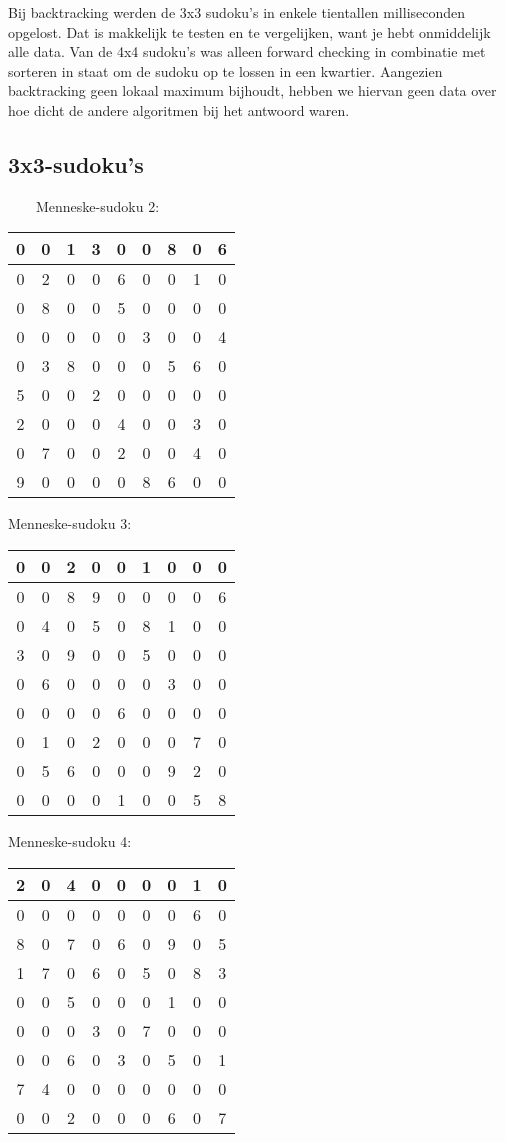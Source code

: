 \documentclass[]{report}
\begin{document}
Bij backtracking werden de 3x3 sudoku's in enkele tientallen milliseconden opgelost. Dat is makkelijk te testen en te vergelijken, want je hebt onmiddelijk alle data. Van de 4x4 sudoku's was alleen forward checking in combinatie met sorteren in staat om de sudoku op te lossen in een kwartier. Aangezien backtracking geen lokaal maximum bijhoudt, hebben we hiervan geen data over hoe dicht de andere algoritmen bij het antwoord waren.

 

\subsection{3x3-sudoku's}
\ \ \ \ Menneske-sudoku 2:
\begin{tabular}{|c|c|c||c|c|c||c|c|c|}
\hline
0 &0& 1& 3& 0& 0& 8& 0& 6 \\ \hline
0 &2 &0 &0 &6 &0 &0& 1& 0\\ \hline
0& 8& 0& 0& 5& 0& 0& 0& 0\\ \hline\hline
0& 0& 0& 0& 0& 3& 0& 0& 4\\ \hline
0 &3 &8 &0 &0 &0 &5 &6 &0\\ \hline
5& 0& 0& 2& 0& 0& 0& 0& 0\\ \hline\hline
2& 0& 0& 0& 4& 0& 0& 3& 0\\ \hline
0 &7 &0 &0 &2 &0 &0 &4 &0\\ \hline
9 &0 &0 &0 &0 &8 &6 &0& 0\\ \hline
\end{tabular}

Menneske-sudoku 3:
\begin{tabular}{|c|c|c||c|c|c||c|c|c|}
\hline
0&0&2&0&0&1&0&0&0 \\ \hline
0&0&8&9&0&0&0&0&6\\ \hline
0&4&0&5&0&8&1&0&0\\ \hline \hline
3&0&9&0&0&5&0&0&0\\ \hline
0&6&0&0&0&0&3&0&0\\ \hline
0&0&0&0&6&0&0&0&0\\ \hline \hline
0&1&0&2&0&0&0&7&0\\ \hline
0&5&6&0&0&0&9&2&0\\ \hline
0&0&0&0&1&0&0&5&8\\ \hline
\end{tabular}

Menneske-sudoku 4:
\begin{tabular}{|c|c|c||c|c|c||c|c|c|}
\hline
2&0&4&0&0&0&0&1&0 \\ \hline
0&0&0&0&0&0&0&6&0\\ \hline
8&0&7&0&6&0&9&0&5\\ \hline \hline
1&7&0&6&0&5&0&8&3\\ \hline
0&0&5&0&0&0&1&0&0\\ \hline
0&0&0&3&0&7&0&0&0\\ \hline \hline
0&0&6&0&3&0&5&0&1\\ \hline
7&4&0&0&0&0&0&0&0\\ \hline
0&0&2&0&0&0&6&0&7\\ \hline
\end{tabular}
\end{document}
